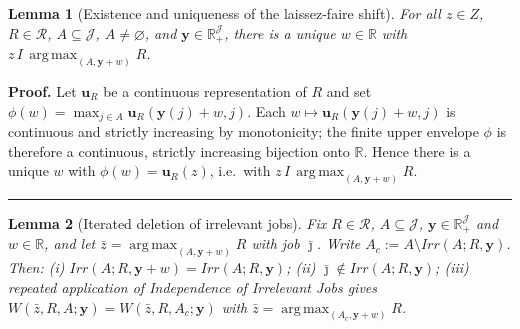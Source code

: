 \documentclass[12pt,thmsb]{article}
\DeclareMathOperator*{\argmax}{arg\,max}
\newtheorem{lemma}{Lemma}
\newenvironment{proof}[1][Proof]{\noindent \textbf{#1.} }{\  \rule{0.5em}{0.5em}}
\begin{document}
\begin{lemma}[Existence and uniqueness of the laissez-faire shift]
\label{lem:w3exists}
For all $z\in Z$, $R\in\mathcal R$, $A\subseteq\mathcal J$, $A\neq\varnothing$,
and $\mathbf y\in\mathbb R_+^{\mathcal J}$, there is a unique $w\in\mathbb R$
with $z\,I\,\argmax_{(A,\mathbf y+w)}R$.
\end{lemma}

\begin{proof}
Let $\mathbf u_R$ be a continuous representation of $R$ and set
$\phi(w)=\max_{j\in A}\mathbf u_R(\mathbf y(j)+w,j)$. Each
$w\mapsto\mathbf u_R(\mathbf y(j)+w,j)$ is continuous and strictly increasing by
monotonicity; the finite upper envelope $\phi$ is therefore a continuous,
strictly increasing bijection onto $\mathbb R$. Hence there is a unique $w$ with
$\phi(w)=\mathbf u_R(z)$, i.e.\ with $z\,I\,\argmax_{(A,\mathbf y+w)}R$.
\end{proof}

\begin{lemma}[Iterated deletion of irrelevant jobs]
\label{lem:w3trim}
Fix $R\in\mathcal R$, $A\subseteq\mathcal J$, $\mathbf y\in\mathbb R_+^{\mathcal
J}$ and $w\in\mathbb R$, and let $\bar z=\argmax_{(A,\mathbf y+w)}R$ with job
$\bar\jmath$. Write $A_c:=A\setminus Irr(A;R,\mathbf y)$. Then:
(i) $Irr(A;R,\mathbf y+w)=Irr(A;R,\mathbf y)$;
(ii) $\bar\jmath\notin Irr(A;R,\mathbf y)$;
(iii) repeated application of Independence of Irrelevant Jobs gives
$W(\bar z,R,A;\mathbf y)=W(\bar z,R,A_c;\mathbf y)$ with
$\bar z=\argmax_{(A_c,\mathbf y+w)}R$.
\end{lemma}
\end{document}
